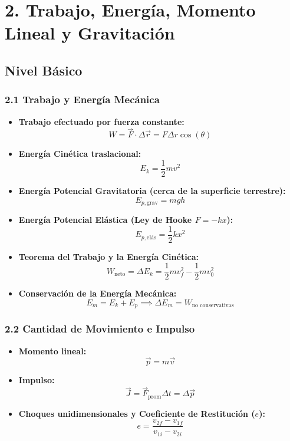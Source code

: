 \documentclass[11pt,a4paper]{article}
\begin{document}
\section*{2. Trabajo, Energía, Momento Lineal y Gravitación}

\subsection*{Nivel Básico}

\subsubsection*{2.1 Trabajo y Energía Mecánica}

\begin{itemize}
  \item \textbf{Trabajo efectuado por fuerza constante:}
  \[
    W = \vec{F} \cdot \Delta\vec{r} = F \Delta r \cos(\theta)
  \]
  \item \textbf{Energía Cinética traslacional:}
  \[
    E_k = \frac{1}{2} m v^2
  \]
  \item \textbf{Energía Potencial Gravitatoria (cerca de la superficie terrestre):}
  \[
    E_{p,\text{grav}} = m g h
  \]
  \item \textbf{Energía Potencial Elástica (Ley de Hooke $F = -kx$):}
  \[
    E_{p,\text{elás}} = \frac{1}{2} k x^2
  \]
  \item \textbf{Teorema del Trabajo y la Energía Cinética:}
  \[
    W_{\text{neto}} = \Delta E_k = \frac{1}{2} m v_f^2 - \frac{1}{2} m v_0^2
  \]
  \item \textbf{Conservación de la Energía Mecánica:}
  \[
    E_m = E_k + E_p \implies \Delta E_m = W_{\text{no conservativas}}
  \]
\end{itemize}

\subsubsection*{2.2 Cantidad de Movimiento e Impulso}

\begin{itemize}
  \item \textbf{Momento lineal:}
  \[
    \vec{p} = m \vec{v}
  \]
  \item \textbf{Impulso:}
  \[
    \vec{J} = \vec{F}_{\text{prom}} \Delta t = \Delta \vec{p}
  \]
  \item \textbf{Choques unidimensionales y Coeficiente de Restitución ($e$):}
  \[
    e = \frac{v_{2f} - v_{1f}}{v_{1i} - v_{2i}}
  \]
\end{itemize}
\end{document}
